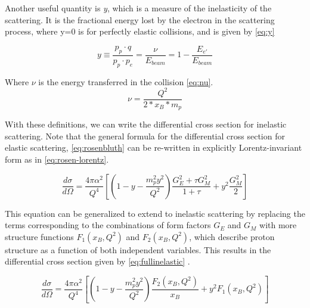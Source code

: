         Another useful quantity is \textit{y}, which is a measure of the inelasticity of the scattering. It is the fractional energy lost by the electron in the scattering process, where y=0 is for perfectly elastic collisions, and is given by \eqref{eq:y}
        
        \begin{equation}\label{eq:y}
            y \equiv \frac{p_p \cdot q}{p_p \cdot p_e} = \frac{\nu}{E_{beam}} =  1 - \frac{E_{e'}}{E_{beam}} 
        \end{equation}

        Where $\nu$ is the energy transferred in the collision \eqref{eq:nu}. 
        \begin{equation}\label{eq:nu}
            \nu = \frac{Q^2}{2*x_B*m_p}
        \end{equation}
        

        With these definitions, we can write the differential cross section for inelastic scattering. Note that the general formula for the differential cross section for elastic scattering, \eqref{eq:rosenbluth} can be re-written in explicitly Lorentz-invariant form as in \eqref{eq:rosen-lorentz}.

        \begin{equation}\label{eq:rosen-lorentz}
            \frac{d\sigma}{d\Omega} = \frac{4\pi\alpha^2}{Q^4} \left[ \left( 1 -y -\frac{m_p^2 y^2}{Q^2}       \right) \frac{G_E^2+\tau G_M^2}{1+\tau} +y^2 \frac{G_M^2}{2} \right]
        \end{equation}

        This equation can be generalized to extend to inelastic scattering by replacing the terms corresponding to the combinations of form factors $G_E$ and $G_M$ with more structure functions $F_1(x_B,Q^2)$ and $F_2(x_B,Q^2)$, which describe proton structure as a function of both independent variables. This results in the differential cross section given by \eqref{eq:fullinelastic} .

        \begin{equation}\label{eq:fullinelastic}
            \frac{d\sigma}{d\Omega} = \frac{4\pi\alpha^2}{Q^4} \left[ \left( 1 -y -\frac{m_p^2 y^2}{Q^2}       \right) \frac{F_2(x_B,Q^2)}{x_B} +y^2 F_1(x_B,Q^2) \right]
        \end{equation}


